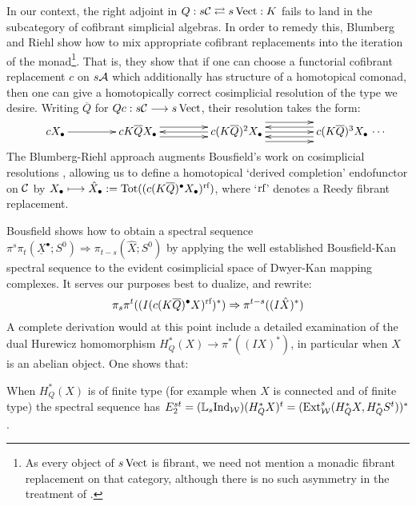 \documentclass[10pt]{article}
\newcommand{\Comm}{\calC}
\begin{document}
\begin{AdamsDerivation}
In our context, the right adjoint in $Q:s\Comm\rightleftarrows s\Vect:K$ fails to land in the subcategory of cofibrant simplicial algebras. In order to remedy this, Blumberg and Riehl show how to mix appropriate cofibrant replacements into the iteration of the monad\footnote{As every object of $s\Vect$ is fibrant, we need not mention a monadic fibrant replacement on that category, although there is no such asymmetry in the treatment of \cite{BlumRiehlResolutions.pdf}.}. That is, they show that if one can choose a functorial cofibrant replacement $c$ on $\ensuremath{s\calA}$ which additionally has structure of a homotopical comonad, then one can give a homotopically correct cosimplicial resolution of the type we desire. Writing $\overline{Q}$ for $Qc:s\Comm\to s\Vect$, their resolution takes the form:
\[
\vcenter{
\def\labelstyle{\scriptstyle}
\xymatrix@C=1.5cm@1{
cX_\bullet\,
\ar[r]
&
\,cK\overline{Q}X_\bullet\,
\ar[r];[]
&
\,c(K\overline{Q})^2X_\bullet\,
\ar@<-1ex>[l];[]
\ar@<+1ex>[l];[]
\ar@<+1ex>[r];[]
\ar@<-1ex>[r];[]
&
\,c(K\overline{Q})^3X_\bullet\,\makebox[0cm][l]{\,$\cdots $}
\ar[l];[]
\ar@<-2ex>[l];[]
\ar@<+2ex>[l];[]
}}\]
The Blumberg-Riehl approach augments Bousfield's work on cosimplicial resolutions \cite{BousCosimpResnHtpySS.pdf},  allowing us to define a homotopical `derived completion' endofunctor on $\Comm$ by $X_\bullet\mapsto\hat X_\bullet:=\textup{Tot}((c(K\overline{Q})^\bullet X_\bullet)^{\textup{rf}})$, where `$\textup{rf}$' denotes a Reedy fibrant replacement.

Bousfield shows how to obtain a spectral sequence $\pi^s\pi_t(\underline{X}^\bullet;S^0)\Rightarrow\pi_{t-s}(\hat X;S^0)$ by applying the well established Bousfield-Kan spectral sequence to the evident cosimplicial space of Dwyer-Kan mapping complexes. It serves our purposes best to dualize, and rewrite:
\[\pi_s\pi^t((I(c(K\overline{Q})^\bullet X)^{\textup{rf}})^*)\Rightarrow \pi^{t-s}((I\hat X)^*)\]
A complete derivation would at this point include a detailed examination of the dual Hurewicz homomorphism $H^*_Q(X)\to \pi^*((IX)^*)$, in particular when $X$ is an abelian object. One shows that:
\begin{prop}
When $H^*_Q(X)$ is of finite type (for example when $X$ is connected and of finite type) the spectral sequence has $E_2^{st}=(\mathbb{L}_s\textup{Ind}_\calW)(H_Q^*X)^t=(\Ext^s_{\calW}(H_Q^*X,H_Q^*S^t))^*$.
\end{prop}
\end{AdamsDerivation}
\end{document}
